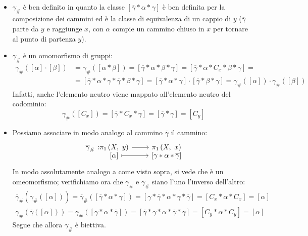 \begin{demonstration}~{}
	\begin{itemize}
		\item $\gamma_{\#}$ è ben definito in quanto la classe $\left[\overline{\gamma}\ast\alpha\ast\gamma\right]$ è ben definita per la composizione dei cammini ed è la classe di equivalenza di un cappio di $y$ ($\overline{\gamma}$ parte da $y$ e raggiunge $x$, con $\alpha$ compie un cammino chiuso in $x$ per tornare al punto di partenza $y$).
		\item $\gamma_{\#}$ è un omomorfismo di gruppi:
		\begin{equation*}
			\begin{array}{lll}
				\gamma_{\#}\left(\left[\alpha\right]\cdot\left[\beta\right]\right)&=\gamma_{\#}\left(\left[\alpha\ast\beta\right]\right)=\left[\overline{\gamma}\ast\alpha\ast\beta\ast\gamma\right]=\left[\overline{\gamma}\ast\alpha\ast C_x\ast\beta\ast\gamma\right]=\\
				&=\left[\overline{\gamma}\ast\alpha\ast \gamma\ast\overline{\gamma}\ast\beta\ast\gamma\right]=\left[\overline{\gamma}\ast\alpha\ast\gamma\right]\cdot\left[\overline{\gamma}\ast\beta\ast\gamma\right]=\gamma_{\#}\left(\left[\alpha\right]\right)\cdot \gamma_{\#}\left(\left[\beta\right]\right)
			\end{array}
		\end{equation*}
	Infatti, anche l'elemento neutro viene mappato all'elemento neutro del codominio:
	\begin{equation*}
		\gamma_{\#}\left(\left[C_x\right]\right)=\left[\overline{\gamma}\ast C_x\ast\gamma\right]=\left[\overline{\gamma}\ast\gamma\right]=\left[C_y\right]
	\end{equation*}
	\item Possiamo associare in modo analogo al cammino $\overline{\gamma}$ il cammino:
	\begin{equation*}
		\funztot{\overline{\gamma}_{\#}}{\gruf{X}{y}}{\gruf{X}{x}}{\left[\alpha\right]}{\left[\gamma\ast\alpha\ast\overline{\gamma}\right]}
	\end{equation*}
In modo assolutamente analogo a come visto sopra, si vede che è un omeomorfismo; verifichiamo ora che $\gamma_{\#}$ e $\overline{\gamma}_{\#}$ siano l'uno l'inverso dell'altro:
\begin{gather*}
	\overline{\gamma}_{\#}\left(\gamma_{\#}\left(\left[\alpha\right]\right)\right)=\overline{\gamma}_{\#}\left(\left[\overline{\gamma}\ast\alpha\ast\gamma\right]\right)=\left[\gamma\ast\overline{\gamma}\ast\alpha\ast\gamma\ast\overline{\gamma}\right]=\left[C_x\ast\alpha\ast C_x\right]=\left[\alpha\right]\\
	\gamma_{\#}\left(\overline{\gamma}\left(\left[\alpha\right]\right)\right)=
	\gamma_{\#}\left(\left[\gamma\ast\alpha\ast\overline{\gamma}\right]\right)=\left[\overline{\gamma}\ast\gamma\ast\alpha\ast\overline{\gamma}\ast\gamma\right]=\left[C_y\ast\alpha\ast C_y\right]=\left[\alpha\right]
\end{gather*}
Segue che allora $\gamma_{\#}$ è biettiva.
\end{itemize}
\vspace{-3mm}
\end{demonstration}

